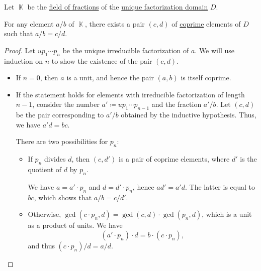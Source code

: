 \begin{proposition}\label{thm:field_of_fractions_coprime_elements}
  Let \( \BbbK \) be the \hyperref[thm:field_of_fractions]{field of fractions} of the \hyperref[def:unique_factorization_domain]{unique factorization domain} \( D \).

  For any element \( a / b \) of \( \BbbK \), there exists a pair \( (c, d) \) of \hyperref[def:coprime_elements]{coprime} elements of \( D \) such that \( a / b = c / d \).
\end{proposition}
\begin{proof}
  Let \( u p_1 \cdots p_n \) be the unique irreducible factorization of \( a \). We will use induction on \( n \) to show the existence of the pair \( (c, d) \).

  \begin{itemize}
    \item If \( n = 0 \), then \( a \) is a unit, and hence the pair \( (a, b) \) is itself coprime.
    \item If the statement holds for elements with irreducible factorization of length \( n - 1 \), consider the number \( a' \coloneqq u p_1 \cdots p_{n-1} \) and the fraction \( a' / b \). Let \( (c, d) \) be the pair corresponding to \( a' / b \) obtained by the inductive hypothesis. Thus, we have \( a' d = bc \).

    There are two possibilities for \( p_n \):
    \begin{itemize}
      \item If \( p_n \) divides \( d \), then \( (c, d') \) is a pair of coprime elements, where \( d' \) is the quotient of \( d \) by \( p_n \).

      We have \( a = a' \cdot p_n \) and \( d = d' \cdot p_n \), hence \( a d' = a' d \). The latter is equal to \( bc \), which shows that \( a / b = c / d' \).

      \item Otherwise, \( \gcd(c \cdot p_n, d) = \gcd(c, d) \cdot \gcd(p_n, d) \), which is a unit as a product of units. We have
      \begin{equation*}
        (a' \cdot p_n) \cdot d = b \cdot (c \cdot p_n),
      \end{equation*}
      and thus \( (c \cdot p_n) / d = a / d \).
    \end{itemize}
  \end{itemize}
\end{proof}

